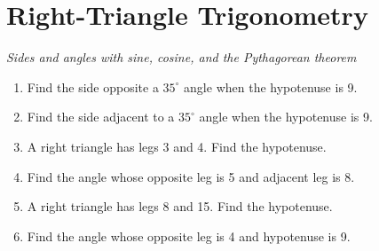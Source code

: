 \documentclass{article}
\begin{document}
\section*{Right-Triangle Trigonometry}
\textit{Sides and angles with sine, cosine, and the Pythagorean theorem}
\begin{enumerate}
  \item Find the side opposite a $35^\circ$ angle when the hypotenuse is 9.
  \item Find the side adjacent to a $35^\circ$ angle when the hypotenuse is 9.
  \item A right triangle has legs 3 and 4. Find the hypotenuse.
  \item Find the angle whose opposite leg is 5 and adjacent leg is 8.
  \item A right triangle has legs 8 and 15. Find the hypotenuse.
  \item Find the angle whose opposite leg is 4 and hypotenuse is 9.
\end{enumerate}
\end{document}
